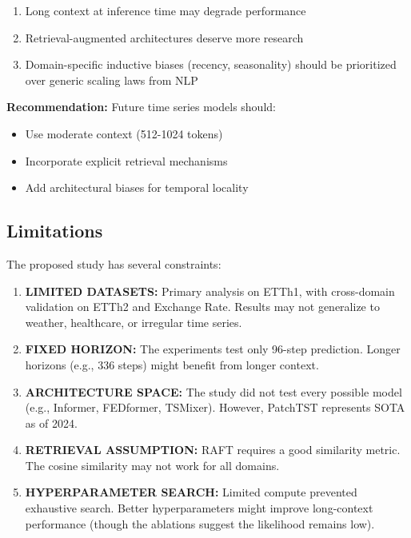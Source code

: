 \documentclass[10pt,twocolumn,letterpaper]{article}
\begin{document}
\begin{enumerate}
    \item Long context at inference time may degrade performance
    \item Retrieval-augmented architectures deserve more research
    \item Domain-specific inductive biases (recency, seasonality) should be prioritized over generic scaling laws from NLP
\end{enumerate}

\noindent\textbf{Recommendation:} Future time series models should:
\begin{itemize}
    \item Use moderate context (512-1024 tokens)
    \item Incorporate explicit retrieval mechanisms
    \item Add architectural biases for temporal locality
\end{itemize}

\subsection{Limitations}

The proposed study has several constraints:

\begin{enumerate}
    \item \textbf{LIMITED DATASETS:} Primary analysis on ETTh1, with cross-domain validation on ETTh2 and Exchange Rate. Results may not generalize to weather, healthcare, or irregular time series.
    
    \item \textbf{FIXED HORIZON:} The experiments test only 96-step prediction. Longer horizons (e.g., 336 steps) might benefit from longer context.
    
    \item \textbf{ARCHITECTURE SPACE:} The study did not test every possible model (e.g., Informer, FEDformer, TSMixer). However, PatchTST represents SOTA as of 2024.
    
    \item \textbf{RETRIEVAL ASSUMPTION:} RAFT requires a good similarity metric. The cosine similarity may not work for all domains.
    
    \item \textbf{HYPERPARAMETER SEARCH:} Limited compute prevented exhaustive search. Better hyperparameters might improve long-context performance (though the ablations suggest the likelihood remains low).
\end{enumerate}
\end{document}
